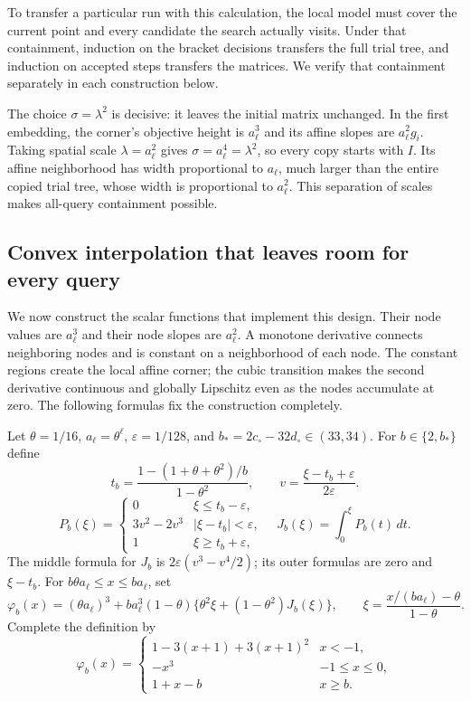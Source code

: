 To transfer a particular run with this calculation, the local model must cover the
current point and every candidate the search actually visits. Under that
containment, induction on the bracket decisions transfers the full trial
tree, and induction on accepted steps transfers the matrices. We verify
that containment separately in each construction below.

The choice $\sigma=\lambda^2$ is decisive: it leaves the initial matrix
unchanged. In the first embedding, the corner's objective height is $a_\ell^3$
and its affine slopes are $a_\ell^2g_i$. Taking spatial scale
$\lambda=a_\ell^2$ gives $\sigma=a_\ell^4=\lambda^2$, so every copy starts
with $I$. Its affine neighborhood has width proportional to $a_\ell$, much
larger than the entire copied trial tree, whose width is proportional to
$a_\ell^2$. This separation of scales makes all-query containment possible.

\subsection{Convex interpolation that leaves room for every query}
We now construct the scalar functions that implement this design. Their node
values are $a_\ell^3$ and their node slopes are $a_\ell^2$. A monotone derivative
connects neighboring nodes and is constant on a neighborhood of each node.
The constant regions create the local affine corner; the cubic transition
makes the second derivative continuous and globally Lipschitz even as the
nodes accumulate at zero. The following formulas fix the construction
completely.

Let $\theta=1/16$, $a_\ell=\theta^\ell$, $\varepsilon=1/128$, and
$b_*=2c_\circ-32d_\circ\in(33,34)$. For $b\in\{2,b_*\}$ define
\[
 t_b=\frac{1-(1+\theta+\theta^2)/b}{1-\theta^2},\qquad
 v=\frac{\xi-t_b+\varepsilon}{2\varepsilon}.
\]
\[
 P_b(\xi)=
 \begin{cases}
 0&\xi\le t_b-\varepsilon,\\
 3v^2-2v^3&|\xi-t_b|<\varepsilon,\\
 1&\xi\ge t_b+\varepsilon,
 \end{cases}
 \quad J_b(\xi)=\int_0^\xi P_b(t)\,dt.
\]
The middle formula for $J_b$ is $2\varepsilon(v^3-v^4/2)$; its outer
formulas are zero and $\xi-t_b$. For
$b\theta a_\ell\le x\le ba_\ell$, set
\begin{equation}\label{art:upper_scalar}
 \varphi_b(x)=(\theta a_\ell)^3+
 ba_\ell^3(1-\theta)
 \{\theta^2\xi+(1-\theta^2)J_b(\xi)\},\qquad
 \xi=\frac{x/(ba_\ell)-\theta}{1-\theta}.
\end{equation}
Complete the definition by
\[
 \varphi_b(x)=
 \begin{cases}
 1-3(x+1)+3(x+1)^2&x<-1,\\
 -x^3&-1\le x\le0,\\
 1+x-b&x\ge b.
 \end{cases}
\]


